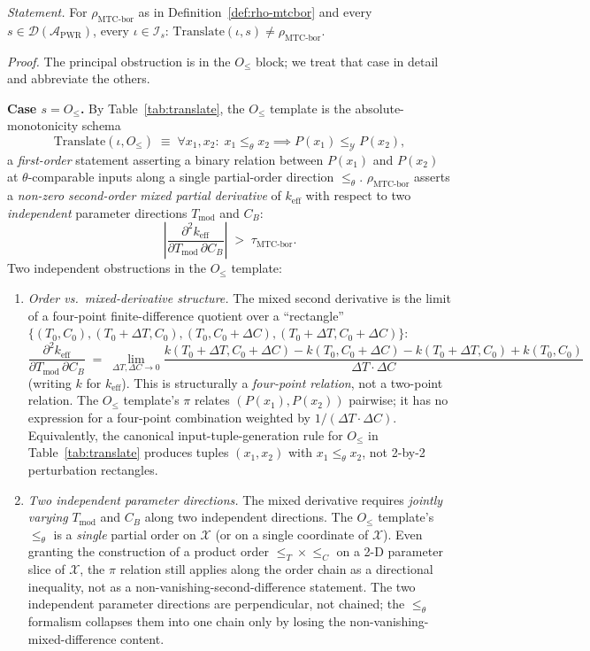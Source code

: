 \documentclass[acmsmall, screen]{acmart}
\begin{document}
\emph{Statement.} For $\rho_{\mathrm{MTC\text{-}bor}}$ as in Definition~\ref{def:rho-mtcbor} and every $s \in \mathcal{D}(\mathcal{A}_{\mathrm{PWR}})$, every $\iota \in \mathcal{I}_{s}$: $\mathrm{Translate}(\iota, s) \neq \rho_{\mathrm{MTC\text{-}bor}}$.

\emph{Proof.} The principal obstruction is in the $O_{\le}$ block; we treat that case in detail and abbreviate the others.

\textbf{Case $s = O_{\le}$.} By Table~\ref{tab:translate}, the $O_{\le}$ template is the absolute-monotonicity schema
\[
\mathrm{Translate}(\iota, O_{\le}) \;\equiv\; \forall x_{1}, x_{2}:\; x_{1} \le_{\theta} x_{2} \implies P(x_{1}) \le_{\mathcal{Y}} P(x_{2}),
\]
a \emph{first-order} statement asserting a binary relation between $P(x_{1})$ and $P(x_{2})$ at $\theta$-comparable inputs along a single partial-order direction $\le_{\theta}$. $\rho_{\mathrm{MTC\text{-}bor}}$ asserts a \emph{non-zero second-order mixed partial derivative} of $k_{\mathrm{eff}}$ with respect to two \emph{independent} parameter directions $T_{\mathrm{mod}}$ and $C_{B}$:
\[
\left|\frac{\partial^{2} k_{\mathrm{eff}}}{\partial T_{\mathrm{mod}}\,\partial C_{B}}\right| \;>\; \tau_{\mathrm{MTC\text{-}bor}}.
\]
Two independent obstructions in the $O_{\le}$ template:
\begin{enumerate}[leftmargin=*,nosep]
  \item[(a)] \emph{Order vs.\ mixed-derivative structure.} The mixed second derivative is the limit of a four-point finite-difference quotient over a ``rectangle'' $\{(T_{0}, C_{0}), (T_{0}+\Delta T, C_{0}), (T_{0}, C_{0}+\Delta C), (T_{0}+\Delta T, C_{0}+\Delta C)\}$:
  \[
  \frac{\partial^{2} k_{\mathrm{eff}}}{\partial T_{\mathrm{mod}}\,\partial C_{B}} \;=\; \lim_{\Delta T, \Delta C \to 0} \frac{k(T_{0}+\Delta T, C_{0}+\Delta C) - k(T_{0}, C_{0}+\Delta C) - k(T_{0}+\Delta T, C_{0}) + k(T_{0}, C_{0})}{\Delta T \cdot \Delta C}
  \]
  (writing $k$ for $k_{\mathrm{eff}}$). This is structurally a \emph{four-point relation}, not a two-point relation. The $O_{\le}$ template's $\pi$ relates $(P(x_{1}), P(x_{2}))$ pairwise; it has no expression for a four-point combination weighted by $1/(\Delta T \cdot \Delta C)$. Equivalently, the canonical input-tuple-generation rule for $O_{\le}$ in Table~\ref{tab:translate} produces tuples $(x_{1}, x_{2})$ with $x_{1} \le_{\theta} x_{2}$, not 2-by-2 perturbation rectangles.
  \item[(b)] \emph{Two independent parameter directions.} The mixed derivative requires \emph{jointly varying} $T_{\mathrm{mod}}$ and $C_{B}$ along two independent directions. The $O_{\le}$ template's $\le_{\theta}$ is a \emph{single} partial order on $\mathcal{X}$ (or on a single coordinate of $\mathcal{X}$). Even granting the construction of a product order $\le_{T} \times \le_{C}$ on a 2-D parameter slice of $\mathcal{X}$, the $\pi$ relation still applies along the order chain as a directional inequality, not as a non-vanishing-second-difference statement. The two independent parameter directions are perpendicular, not chained; the $\le_{\theta}$ formalism collapses them into one chain only by losing the non-vanishing-mixed-difference content.
\end{enumerate}
\end{document}
